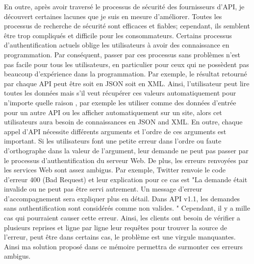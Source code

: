 En outre, après avoir traversé le processus de sécurité des fournisseurs d'API, je
découvert certaines lacunes que je suis en mesure d'améliorer. Toutes les processus de recherche de sécurité sont efficaces et fiables; cependant, ils semblent être trop compliqués et difficile pour les consommateurs. Certains processus d'authentification actuels oblige les utilisateurs à avoir des connaissance en programmation. Par conséquent,  passer par ces processus sans problèmes n'est pas facile pour tous les utilisateurs, en particulier pour ceux qui ne possèdent pas beaucoup d'expérience dans la programmation. Par exemple, le résultat retourné par chaque API peut être soit en JSON soit en XML. Ainsi, l'utilisateur peut lire toutes les données mais s'il veut récupérer  ces valeurs automatiquement pour n'importe quelle raison , par exemple les utiliser comme des données d'entrée pour un autre API ou les afficher automatiquement sur un site, alors cet utilisateurs aura besoin de connaissances en JSON and XML.
En outre, chaque appel d'API nécessite différents arguments et l'ordre de ces arguments
est important. Si les utilisateurs font une petite erreur dans l'ordre ou faute d'orthographe dans la valeur de l'argument, leur demande ne peut pas passer par le processus d'authentification du serveur Web.  De plus, les erreurs renvoyées par les services Web sont assez ambigus. Par exemple, Twitter renvoie le code d'erreur 400 (Bad Request) et leur explication pour ce cas est "La demande était invalide ou ne peut pas être servi autrement. Un message d'erreur d'accompagnement sera expliquer plus en détail. Dans API v1.1, les demandes sans authentification sont considérés comme non valides. " Cependant, il y a mille cas qui pourraient causer cette erreur. Ainsi, les clients ont besoin de vérifier a plusieurs reprises et ligne par ligne leur requêtes pour trouver la source de l'erreur,  peut être dans certains cas,  le problème est une virgule manquantes.  Ainsi ma solution proposé dans ce mémoire permettra de surmonter ces erreurs ambigus.

